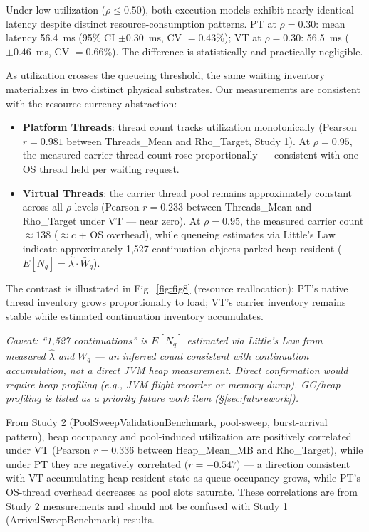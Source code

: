 \documentclass[10pt]{article}
\newenvironment{caveat}{\small\itshape}{\par}
\begin{document}
Under low utilization ($\rho \leq 0.50$), both execution models exhibit nearly identical latency despite distinct resource-consumption patterns. PT at $\rho = 0.30$: mean latency 56.4~ms (95\% CI $\pm 0.30$~ms, CV $= 0.43\%$); VT at $\rho = 0.30$: 56.5~ms ($\pm 0.46$~ms, CV $= 0.66\%$). The difference is statistically and practically negligible.

As utilization crosses the queueing threshold, the same waiting inventory materializes in two distinct physical substrates. Our measurements are consistent with the resource-currency abstraction:

\begin{itemize}
\item \textbf{Platform Threads}: thread count tracks utilization monotonically (Pearson $r = 0.981$ between Threads\_Mean and Rho\_Target, Study 1). At $\rho = 0.95$, the measured carrier thread count rose proportionally --- consistent with one OS thread held per waiting request.
\item \textbf{Virtual Threads}: the carrier thread pool remains approximately constant across all $\rho$ levels (Pearson $r = 0.233$ between Threads\_Mean and Rho\_Target under VT --- near zero). At $\rho = 0.95$, the measured carrier count $\approx 138$ ($\approx c$ + OS overhead), while queueing estimates via Little's Law indicate approximately 1{,}527 continuation objects parked heap-resident ($E[N_q] = \hat\lambda \cdot \bar W_q$).
\end{itemize}

The contrast is illustrated in Fig.~\ref{fig:fig8} (resource reallocation): PT's native thread inventory grows proportionally to load; VT's carrier inventory remains stable while estimated continuation inventory accumulates.

\begin{caveat}
Caveat: ``1{,}527 continuations'' is $E[N_q]$ estimated via Little's Law from measured $\hat\lambda$ and $\bar W_q$ --- an inferred count consistent with continuation accumulation, not a direct JVM heap measurement. Direct confirmation would require heap profiling (e.g., JVM flight recorder or memory dump). GC/heap profiling is listed as a priority future work item (\S\ref{sec:futurework}).
\end{caveat}

From Study 2 (PoolSweepValidationBenchmark, pool-sweep, burst-arrival pattern), heap occupancy and pool-induced utilization are positively correlated under VT (Pearson $r = 0.336$ between Heap\_Mean\_MB and Rho\_Target), while under PT they are negatively correlated ($r = -0.547$) --- a direction consistent with VT accumulating heap-resident state as queue occupancy grows, while PT's OS-thread overhead decreases as pool slots saturate. These correlations are from Study 2 measurements and should not be confused with Study 1 (ArrivalSweepBenchmark) results.
\end{document}
